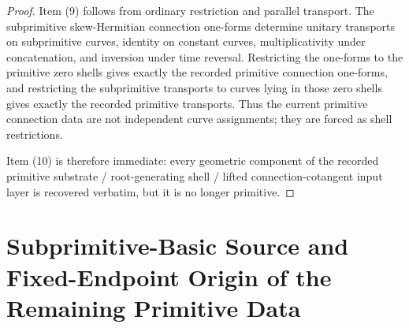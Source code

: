 \documentclass[11pt]{article}
\begin{document}
\begin{proof}
Item (9) follows from ordinary restriction and parallel transport. The subprimitive skew-Hermitian connection one-forms determine unitary transports on subprimitive curves, identity on constant curves, multiplicativity under concatenation, and inversion under time reversal. Restricting the one-forms to the primitive zero shells gives exactly the recorded primitive connection one-forms, and restricting the subprimitive transports to curves lying in those zero shells gives exactly the recorded primitive transports. Thus the current primitive connection data are not independent curve assignments; they are forced as shell restrictions.

Item (10) is therefore immediate: every geometric component of the recorded primitive substrate / root-generating shell / lifted connection-cotangent input layer is recovered verbatim, but it is no longer primitive.
\end{proof}

\section{Subprimitive-Basic Source and Fixed-Endpoint Origin of the Remaining Primitive Data}
\end{document}
